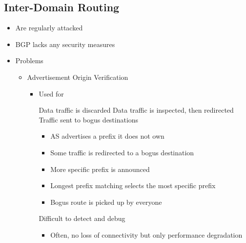 \subsection{Inter-Domain Routing}
\begin{itemize}
    \item Are regularly attacked
    \item BGP lacks any security measures
    \item Problems
        \begin{itemize}
            \item Advertisement Origin Verification
                \begin{itemize}
                     No-one checks that a AS own the prefixes it advertises
                    \item Used for
                        \begin{itemize}
                             Data traffic is discarded
                             Data traffic is inspected, then redirected
                             Traffic sent to bogus destinations
                        \end{itemize}
                        \begin{itemize}
                            \item AS advertises a prefix it does not own
                            \item Some traffic is redirected to a bogus destination
                        \end{itemize}
                        \begin{itemize}
                            \item More specific prefix is announced
                            \item Longest prefix matching selects the most specific prefix
                            \item Bogus route is picked up by everyone
                        \end{itemize}
                    \icon Difficult to detect and debug
                        \begin{itemize}
                            \item Often, no loss of connectivity but only performance degradation
                        \end{itemize}

\end{itemize}
\end{itemize}
\end{itemize}
